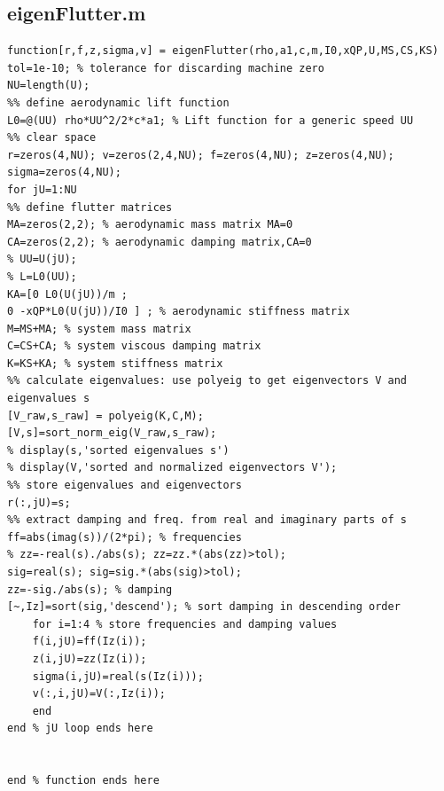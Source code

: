 \documentclass{article}
\begin{document}
\subsection{eigenFlutter.m}
\begin{lstlisting}[caption={Helper script for Homework 1.}, label={lst:main_script}]
function[r,f,z,sigma,v] = eigenFlutter(rho,a1,c,m,I0,xQP,U,MS,CS,KS)
tol=1e-10; % tolerance for discarding machine zero
NU=length(U);
%% define aerodynamic lift function
L0=@(UU) rho*UU^2/2*c*a1; % Lift function for a generic speed UU
%% clear space
r=zeros(4,NU); v=zeros(2,4,NU); f=zeros(4,NU); z=zeros(4,NU); sigma=zeros(4,NU);
for jU=1:NU
%% define flutter matrices
MA=zeros(2,2); % aerodynamic mass matrix MA=0
CA=zeros(2,2); % aerodynamic damping matrix,CA=0
% UU=U(jU);
% L=L0(UU);
KA=[0 L0(U(jU))/m ;
0 -xQP*L0(U(jU))/I0 ] ; % aerodynamic stiffness matrix
M=MS+MA; % system mass matrix
C=CS+CA; % system viscous damping matrix
K=KS+KA; % system stiffness matrix
%% calculate eigenvalues: use polyeig to get eigenvectors V and eigenvalues s
[V_raw,s_raw] = polyeig(K,C,M);
[V,s]=sort_norm_eig(V_raw,s_raw);
% display(s,'sorted eigenvalues s')
% display(V,'sorted and normalized eigenvectors V');
%% store eigenvalues and eigenvectors
r(:,jU)=s;
%% extract damping and freq. from real and imaginary parts of s
ff=abs(imag(s))/(2*pi); % frequencies
% zz=-real(s)./abs(s); zz=zz.*(abs(zz)>tol);
sig=real(s); sig=sig.*(abs(sig)>tol);
zz=-sig./abs(s); % damping
[~,Iz]=sort(sig,'descend'); % sort damping in descending order
    for i=1:4 % store frequencies and damping values
    f(i,jU)=ff(Iz(i));
    z(i,jU)=zz(Iz(i));
    sigma(i,jU)=real(s(Iz(i)));
    v(:,i,jU)=V(:,Iz(i));
    end
end % jU loop ends here


end % function ends here
\end{lstlisting}

\newpage
\end{document}
